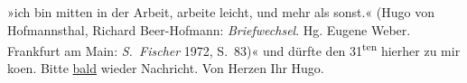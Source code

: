 \begin{ledgroupsized}[t]{13cm}
{{{                     »ich bin mitten in der Arbeit, arbeite leicht, und mehr als
                     sonst.« (Hugo von Hofmannsthal, Richard Beer-Hofmann: \emph{Briefwechsel}. Hg. Eugene Weber. Frankfurt am Main:
                        \emph{S. Fischer} 1972, S. 83)}}}\label{K_L00838_1h}« und dürfte den
                     31\textsuperscript{ten} hierher zu mir ko{\geminationm}en. Bitte \uline{bald} wieder Nachricht. Von Herzen Ihr \spacefill\mbox{Hugo.}\pend
           
         
         \endnumbering{}\end{ledgroupsized}  \newcommand{\dateiname}{L00838}\newcommand{\titel}{Hugo von Hofmannsthal an Arthur Schnitzler, 25. 8. 1898}\newcommand{\editorInnen}{Martin Anton Müller und Gerd-Hermann Susen}
      
